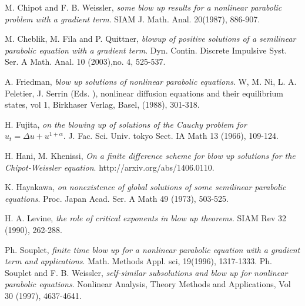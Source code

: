 \documentclass[a4paper,12pt,english,reqno]{smfart}
\begin{document}
	\begin{thebibliography}{9}
		
		M. Chipot and F. B. Weissler,
		\emph{some blow up results for a nonlinear parabolic problem with a gradient term}.
		SIAM J. Math. Anal. 20(1987), 886-907.  
		
		M. Cheblik, M. Fila and P. Quittner,
		\emph{blowup of positive solutions of a semilinear parabolic equation with a gradient term}.
		Dyn. Contin. Discrete Impulsive Syst. Ser. A Math. Anal. 10 (2003),no. 4, 525-537.
		
		
		A. Friedman,
		\emph{blow up solutions of nonlinear parabolic equations}.
		W, M. Ni, L. A. Peletier, J. Serrin (Eds. ), nonlinear diffusion equations and their equilibrium states, vol 1, Birkhaser Verlag, Basel, (1988), 301-318. 
		
		
		H. Fujita,
		\emph{on the blowing up of solutions of the Cauchy problem for $u_{t}=\Delta u+u^{1+\alpha}$}.
		J. Fac. Sci. Univ. tokyo Sect. IA Math 13 (1966), 109-124. 
	
		
	
	
	
		
		H. Hani, M. Khenissi,
		\emph{On a finite difference scheme for blow up solutions for the Chipot-Weissler equation}.
		http://arxiv.org/abs/1406.0110.
		
		K. Hayakawa,
		\emph{on nonexistence of global solutions of some semilinear parabolic equations}.
		Proc. Japan Acad. Ser. A Math 49 (1973), 503-525. 
		
		H. A. Levine,
		\emph{the role of critical exponents in blow up theorems}.
		SIAM Rev 32 (1990), 262-288. 
		
		
		
		Ph. Souplet,
		\emph{finite time blow up for a nonlinear parabolic equation with a gradient term and applications}.
		Math. Methods Appl. sci, 19(1996), 1317-1333.
		Ph. Souplet and F. B. Weissler,
		\emph{self-similar subsolutions and blow up for nonlinear parabolic equations}.
		Nonlinear Analysis, Theory Methods and Applications, Vol 30 (1997), 4637-4641.                             
	\end{thebibliography}
	
\end{document}
